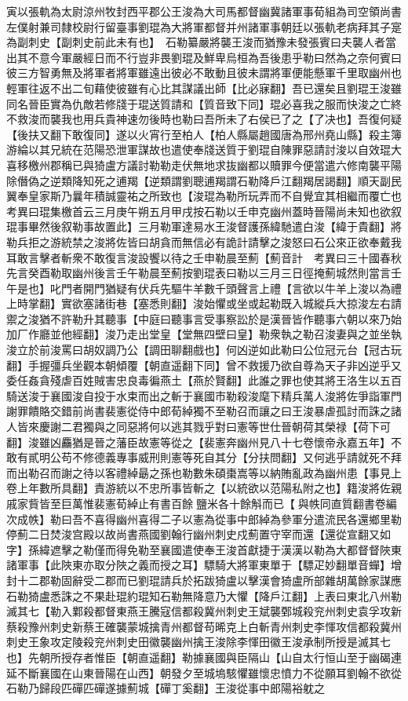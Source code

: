 寅以張軌為太尉涼州牧封西平郡公王浚為大司馬都督幽冀諸軍事荀組為司空領尚書左僕射兼司隸校尉行留臺事劉琨為大將軍都督并州諸軍事朝廷以張軌老病拜其子寔為副刺史【副刺史前此未有也】　石勒纂嚴將襲王浚而猶豫未發張賓曰夫襲人者當出其不意今軍嚴經日而不行豈非畏劉琨及鮮卑烏桓為吾後患乎勒曰然為之奈何賓曰彼三方智勇無及將軍者將軍雖遠出彼必不敢動且彼未謂將軍便能懸軍千里取幽州也輕軍往返不出二旬藉使彼雖有心比其謀議出師【比必寐翻】吾已還矣且劉琨王浚雖同名晉臣實為仇敵若修牋于琨送質請和【質音致下同】琨必喜我之服而快浚之亡終不救浚而襲我也用兵貴神速勿後時也勒曰吾所未了右侯已了之【了决也】吾復何疑【後扶又翻下敢復同】遂以火宵行至柏人【柏人縣屬趙國唐為邢州堯山縣】殺主簿游綸以其兄統在范陽恐泄軍謀故也遣使奉牋送質于劉琨自陳罪惡請討浚以自效琨大喜移檄州郡稱已與猗盧方議討勒勒走伏無地求抜幽都以贖罪今便當遣六修南襲平陽除僭偽之逆類降知死之逋羯【逆類謂劉聰逋羯謂石勒降戶江翻羯居謁翻】順天副民翼奉皇家斯乃曩年積誠靈祐之所致也【浚琨為勒所玩弄而不自覺宜其相繼而覆亡也　考異曰琨集檄首云三月庚午朔五月甲戌按石勒以壬申克幽州蓋時晉陽尚未知也欲叙琨事畢然後叙勒事故置此】三月勒軍達易水王浚督護孫緯馳遣白浚【緯于貴翻】將勒兵拒之游統禁之浚將佐皆曰胡貪而無信必有詭計請擊之浚怒曰石公來正欲奉戴我耳敢言擊者斬衆不敢復言浚設饗以待之壬申勒晨至薊【薊音計　考異曰三十國春秋先言癸酉勒取幽州後言壬午勒晨至薊按劉琨表曰勒以三月三日徑掩薊城然則當言壬午是也】叱門者開門猶疑有伏兵先驅牛羊數千頭聲言上禮【言欲以牛羊上浚以為禮上時掌翻】實欲塞諸街巷【塞悉則翻】浚始懼或坐或起勒既入城縱兵大掠浚左右請禦之浚猶不許勒升其聽事【中庭曰聽事言受事察訟於是漢晉皆作聽事六朝以來乃始加厂作廳並他經翻】浚乃走出堂皇【堂無四壁曰皇】勒衆執之勒召浚妻與之並坐執浚立於前浚罵曰胡奴調乃公【調田聊翻戲也】何凶逆如此勒曰公位冠元台【冠古玩翻】手握彊兵坐觀本朝傾覆【朝直遥翻下同】曾不救援乃欲自尊為天子非凶逆乎又委任姦貪殘虐百姓賊害忠良毒徧燕土【燕於賢翻】此誰之罪也使其將王洛生以五百騎送浚于襄國浚自投于水束而出之斬于襄國市勒殺浚麾下精兵萬人浚將佐爭詣軍門謝罪饋賂交錯前尚書裴憲從侍中郎荀綽獨不至勒召而讓之曰王浚暴虐孤討而誅之諸人皆來慶謝二君獨與之同惡將何以逃其戮乎對曰憲等世仕晉朝荷其榮禄【荷下可翻】浚雖凶麤猶是晉之藩臣故憲等從之【裴憲奔幽州見八十七卷懷帝永嘉五年】不敢有貳明公苟不修德義專事威刑則憲等死自其分【分扶問翻】又何逃乎請就死不拜而出勒召而謝之待以客禮綽朂之孫也勒數朱碩棗嵩等以納賄亂政為幽州患【事見上卷上年數所具翻】責游統以不忠所事皆斬之【以統欲以范陽私附之也】籍浚將佐親戚家貲皆至巨萬惟裴憲荀綽止有書百餘鹽米各十餘斛而已【與帙同直質翻書卷編次成帙】勒曰吾不喜得幽州喜得二子以憲為從事中郎綽為參軍分遣流民各還鄉里勒停薊二日焚浚宫殿以故尚書燕國劉翰行幽州刺史戍薊置守宰而還【還從宣翻又如字】孫緯遮擊之勒僅而得免勒至襄國遣使奉王浚首獻捷于漢漢以勒為大都督督陜東諸軍事【此陜東亦取分陜之義而授之耳】驃騎大將軍東單于【驃疋妙翻單音蟬】增封十二郡勒固辭受二郡而已劉琨請兵於拓跋猗盧以擊漢會猗盧所部雜胡萬餘家謀應石勒猗盧悉誅之不果赴琨約琨知石勒無降意乃大懼【降戶江翻】上表曰東北八州勒滅其七【勒入鄴殺都督東燕王騰寇信都殺冀州刺史王斌襲鄄城殺兖州刺史袁孚攻新蔡殺豫州刺史新蔡王確襲蒙城擒青州都督苟晞克上白斬青州刺史李惲攻信都殺冀州刺史王象攻定陵殺兖州刺史田徽襲幽州擒王浚除李惲田徽王浚承制所授是滅其七也】先朝所授存者惟臣【朝直遥翻】勒據襄國與臣隔山【山自太行恒山至于幽碣連延不斷襄國在山東晉陽在山西】朝發夕至城塢駭懼雖懷忠憤力不從願耳劉翰不欲從石勒乃歸段匹磾匹磾遂據薊城【磾丁奚翻】王浚從事中郎陽裕躭之